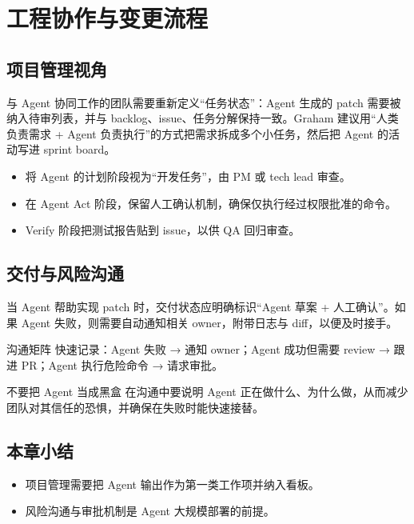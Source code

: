 \section{工程协作与变更流程}
\subsection{项目管理视角}
与 Agent 协同工作的团队需要重新定义“任务状态”：Agent 生成的 patch 需要被纳入待审列表，并与 backlog、issue、任务分解保持一致。Graham 建议用“人类负责需求 + Agent 负责执行”的方式把需求拆成多个小任务，然后把 Agent 的活动写进 sprint board。

\begin{itemize}
    \item 将 Agent 的计划阶段视为“开发任务”，由 PM 或 tech lead 审查。
    \item 在 Agent Act 阶段，保留人工确认机制，确保仅执行经过权限批准的命令。
    \item Verify 阶段把测试报告贴到 issue，以供 QA 回归审查。
\end{itemize}

\subsection{交付与风险沟通}
当 Agent 帮助实现 patch 时，交付状态应明确标识“Agent 草案 + 人工确认”。如果 Agent 失败，则需要自动通知相关 owner，附带日志与 diff，以便及时接手。

 \begin{knowledgebox}{沟通矩阵}
快速记录：Agent 失败 → 通知 owner；Agent 成功但需要 review → 跟进 PR；Agent 执行危险命令 → 请求审批。
\end{knowledgebox}

\begin{warningbox}{不要把 Agent 当成黑盒}
在沟通中要说明 Agent 正在做什么、为什么做，从而减少团队对其信任的恐惧，并确保在失败时能快速接替。
\end{warningbox}

\subsection{本章小结}
\begin{itemize}
    \item 项目管理需要把 Agent 输出作为第一类工作项并纳入看板。
    \item 风险沟通与审批机制是 Agent 大规模部署的前提。
\end{itemize}

